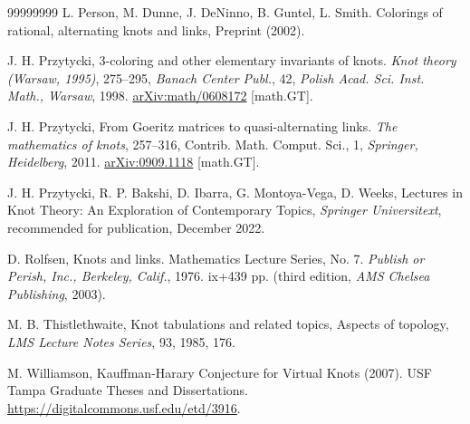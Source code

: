 \documentclass[11pt]{amsart}
\begin{document}
\begin{thebibliography}{99999999}
L. Person, M. Dunne, J. DeNinno, B. Guntel, L. Smith. Colorings of rational, alternating knots and links, Preprint (2002).

J. H. Przytycki, 3-coloring and other elementary invariants of knots. {\it Knot theory (Warsaw, 1995)}, 275–295, 
{\it Banach Center Publ.}, 42, {\it Polish Acad. Sci. Inst. Math., Warsaw}, 1998. \href{https://arxiv.org/abs/math/0608172}{arXiv:math/0608172} [math.GT].

 J. H. Przytycki,
From Goeritz matrices to quasi-alternating links. {\it The mathematics of knots}, 257–316, 
Contrib. Math. Comput. Sci., 1, {\it Springer, Heidelberg}, 2011. \href{https://arxiv.org/abs/0909.1118}{arXiv:0909.1118} [math.GT].

 J. H. Przytycki, R. P. Bakshi, D. Ibarra, G. Montoya-Vega,  D. Weeks,  Lectures in Knot Theory: An Exploration of Contemporary Topics, {\it Springer Universitext}, recommended for publication, December 2022.

D. Rolfsen, Knots and links. 
Mathematics Lecture Series, No. 7. \textit{Publish or Perish, Inc., Berkeley, Calif.}, 1976. ix+439 pp. (third edition, \textit{AMS Chelsea Publishing}, 2003).

 M. B. Thistlethwaite, Knot tabulations and related topics, Aspects of topology, \textit{LMS Lecture Notes Series}, 93, 1985, 176.

 M. Williamson, Kauffman-Harary Conjecture for Virtual Knots (2007). USF Tampa Graduate Theses and Dissertations. \href{
https://digitalcommons.usf.edu/etd/3916}{https://digitalcommons.usf.edu/etd/3916}.

\end{thebibliography}
\end{document}
